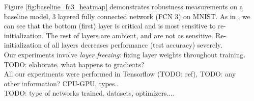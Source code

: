 \documentclass{article}
\begin{document}
Figure \ref{fig:baseline_fc3_heatmap} demonstrates robustness measurements on a baseline model, 3 layered fully connected network (FCN 3) on MNIST. As in \cite{allLayers}, we can see that the bottom (first) layer is critical and is most sensitive to  re-initialization. The rest of layers are ambient, and are not as sensitive. Re-initialization of all layers decreases performance (test accuracy) severely.\\
Our experiments involve \emph{layer freezing}: fixing layer weights throughout training. TODO: elaborate. what happens to gradients?\\
All our experiments were performed in Tensorflow (TODO: ref), TODO: any other information? CPU-GPU, types..\\
TODO: type of networks trained, datasets, optimizers....
\end{document}
